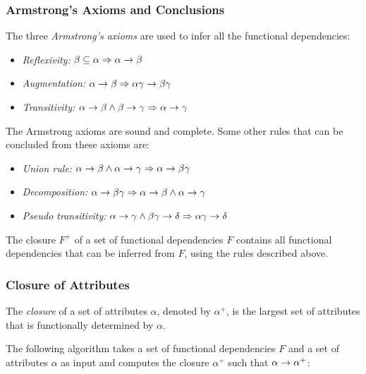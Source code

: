 \subsubsection{Armstrong's Axioms and Conclusions}
\label{armstrongs_axioms}

The three \emph{Armstrong's axioms} are used to infer all the functional dependencies:
\begin{itemize}
\item \emph{Reflexivity:} $\beta \subseteq \alpha \Rightarrow \alpha \rightarrow \beta$
\item \emph{Augmentation:} $\alpha \rightarrow \beta \Rightarrow \alpha\gamma \rightarrow \beta\gamma$
\item \emph{Transitivity:} $\alpha \rightarrow \beta \wedge \beta \rightarrow \gamma \Rightarrow \alpha \rightarrow \gamma$
\end{itemize}

The Armstrong axioms are sound and complete. Some other rules that can be concluded from these axioms are:
\begin{itemize}
\item \emph{Union rule:} $\alpha \rightarrow \beta \wedge \alpha \rightarrow \gamma \Rightarrow \alpha \rightarrow \beta\gamma$
\item \emph{Decomposition:} $\alpha \rightarrow \beta\gamma \Rightarrow \alpha \rightarrow \beta \wedge \alpha \rightarrow \gamma$
\item \emph{Pseudo transitivity:} $\alpha \rightarrow \gamma \wedge \beta\gamma \rightarrow \delta \Rightarrow \alpha\gamma \rightarrow \delta$
\end{itemize}

\begin{note}
The closure $F^+$ of a set of functional dependencies $F$ contains all functional dependencies that can be inferred from $F$, using the rules described above.
\end{note}




\subsubsection{Closure of Attributes}

The \emph{closure} of a set of attributes $\alpha$, denoted by $\alpha^+$, is the largest set of attributes that is functionally determined by $\alpha$.

The following algorithm takes a set of functional dependencies $F$ and a set of attributes $\alpha$ as input and computes the closure $\alpha^+$ such that $\alpha \rightarrow \alpha^+$:

